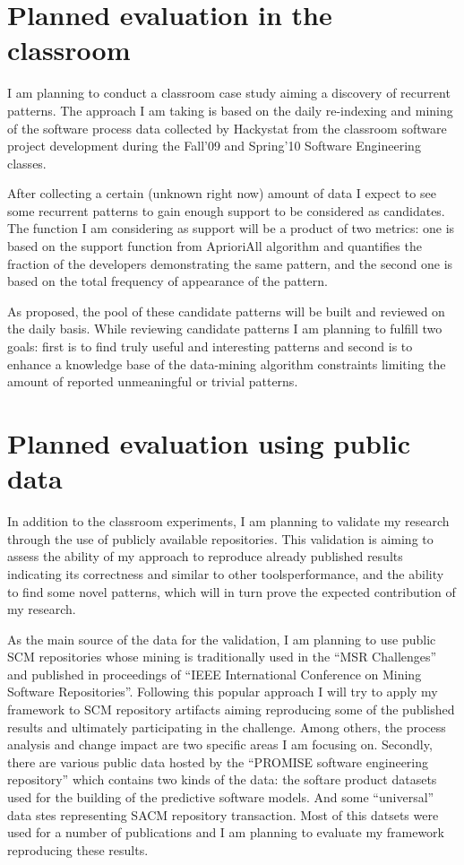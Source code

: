 \section{Planned evaluation in the classroom}
I am planning to conduct a classroom case study aiming a discovery of recurrent patterns. The approach I am taking is based on the daily re-indexing and mining of the software process data collected by Hackystat from the classroom software project development during the Fall'09 and Spring'10 Software Engineering classes. 

After collecting a certain (unknown right now) amount of data I expect to see some recurrent patterns to gain enough support to be considered as candidates. The function I am considering as support will be a product of two metrics: one is based on the support function from AprioriAll algorithm and quantifies the fraction of the developers demonstrating the same pattern, and the second one is based on the total frequency of appearance of the pattern. 

As proposed, the pool of these candidate patterns will be built and reviewed on the daily basis. While reviewing candidate patterns I am planning to fulfill two goals: first is to find truly useful and interesting patterns and second is to enhance a knowledge base of the data-mining algorithm constraints limiting the amount of reported unmeaningful or trivial patterns.

\section{Planned evaluation using public data}
In addition to the classroom experiments, I am planning to validate my research through the use of publicly available repositories. This validation is aiming to assess the ability of my approach to reproduce already published results indicating its correctness and similar to other toolsperformance, and the ability to find some novel patterns, which will in turn prove the expected contribution of my research.

As the main source of the data for the validation, I am planning to use public SCM repositories whose mining is traditionally used in the ``MSR Challenges'' \cite{citeulike:5043676} and published in proceedings of ``IEEE International Conference on Mining Software Repositories''. Following this popular approach I will try to apply my framework to SCM repository artifacts aiming reproducing some of the published results and ultimately participating in the challenge. Among others, the process analysis and change impact are two specific areas I am focusing on. Secondly, there are various public data hosted by the ``PROMISE software engineering repository'' \cite{Sayyad:2005} which contains two kinds of the data: the softare product datasets used for the building of the predictive software models. And some ``universal'' data stes representing SACM repository transaction. Most of this datsets were used for a number of publications and I am planning to evaluate my framework reproducing these results. 